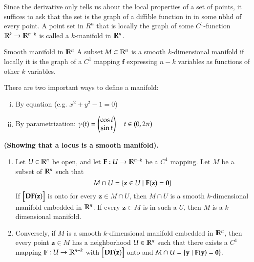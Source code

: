 Since the derivative only tells us about the local properties of a set of points, it suffices to ask that the set is the graph of a diffible function in in some nbhd of every point. A point set in $R^n$ that is locally the graph of some $C^1$-function $\mathbb{R}^k\to \mathbb{R}^{n-k}$ is called a $k$-manifold in $\mathbb{R}^n$.

\begin{defn}{Smooth manifold in $\mathbb{R}^n$}
A subset $M\subset \mathbb{R}^n$ is a smooth $k$-dimensional manifold if locally it is the graph of a $C^1$ mapping $\bm{f}$ expressing $n-k$ variables as functions of other $k$ variables.
\end{defn}

There are two important ways to define a manifold:
\begin{enumerate}[(i)]
  \item By equation (e.g. $x^2 + y^2 -1 = 0$)
  \item By parametrization: $\displaystyle \gamma (t)=\begin{pmatrix} \cos t \\ \sin t \end{pmatrix}\quad t\in (0,2\pi)$
\end{enumerate}

\begin{theorem}
  \textbf{(Showing that a locus is a smooth manifold).} \begin{enumerate}
 \item Let $U\in \mathbb{R}^n$ be open, and let $\textbf{F}:U\to \mathbb{R}^{n-k}$ be a $C^1$ mapping. Let $M$ be a subset of $\mathbb{R}^n$ such that
 \begin{equation}
 	M\cap U = \left\{ \textbf{z}\in U \mid \textbf{F}(\textbf{z})=\textbf{0} \right\}
 \end{equation}
 If $\begin{bmatrix} \textbf{DF}(\textbf{z}) \end{bmatrix}$ is onto for every $\bm{z}\in M\cap U$, then $M\cap U$ is a smooth $k$-dimensional manifold embedded in $\mathbb{R}^n$. If every $\bm{z}\in M$ is in such a $U$, then $M$ is a $k$-dimensional manifold. 
 
 \item Conversely, if $M$ is a smooth $k$-dimensional manifold embedded in $\mathbb{R}^n$, then every point $\bm{z}\in M$ has a neighborhood $U\in \mathbb{R}^n$ such that there exists a $C^1$ mapping $\textbf{F}:U\to \mathbb{R}^{n-k}$ with $\begin{bmatrix} \textbf{DF}(\textbf{z}) \end{bmatrix}$ onto and $M \cap U = \left\{ \textbf{y} \mid \textbf{F}(\textbf{y}) = \textbf{0} \right\}$. 
 \end{enumerate}

\end{theorem}
